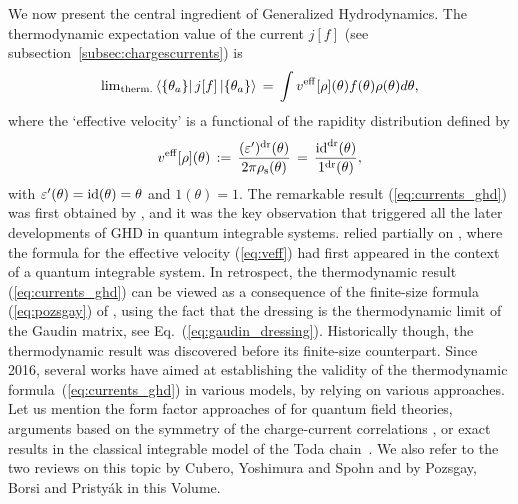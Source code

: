 \documentclass[onecolumn,amsfonts,showpacs,superscriptaddress]{revtex4-1}
\begin{document}
We now present the central ingredient of Generalized Hydrodynamics. The thermodynamic expectation value of the current $j[f]$ (see subsection~\ref{subsec:chargescurrents}) is
\begin{equation}
    \label{eq:currents_ghd}
	{\rm lim}_{\rm therm.}  \left< \{\theta_a \} \right|  j [f]  \left| \{ \theta_a \} \right>  \, = \, \int  v^{\rm eff}[\rho] (\theta) f(\theta) \rho(\theta) d \theta,
\end{equation}
where the `effective velocity' is a functional of the rapidity distribution defined by
\begin{equation}
    \label{eq:veff}
	v^{\rm eff}[\rho] (\theta) \, := \, \frac{ (\varepsilon')^{\rm dr} (\theta) }{2 \pi \rho_{\rm s}(\theta)} \, = \, \frac{ {\rm id}^{\rm dr} (\theta) }{1^{\rm dr}(\theta)}  ,
\end{equation}
with $\varepsilon'(\theta) = {\rm id}(\theta) = \theta$ and $1(\theta) = 1$. The remarkable result (\ref{eq:currents_ghd}) was first obtained by \citep{castro2016emergent,bertini2016transport}, and it was the key observation that triggered all the later developments of GHD in quantum integrable systems. \cite{bertini2016transport} relied partially on \citep{bonnes2014light}, where the formula for the effective velocity (\ref{eq:veff}) had first appeared in the context of a quantum integrable system. In retrospect, the thermodynamic result (\ref{eq:currents_ghd}) can be viewed as a consequence of the finite-size formula (\ref{eq:pozsgay}) of \citep{borsi2020current,pozsgay2020algebraic,pozsgay2020current}, using the fact that the dressing is the thermodynamic limit of the Gaudin matrix, see Eq.~(\ref{eq:gaudin_dressing}). Historically though, the thermodynamic result was discovered before its finite-size counterpart. Since 2016, several works have aimed at  establishing the validity of the thermodynamic formula~(\ref{eq:currents_ghd}) in various models, by relying on various approaches. Let us mention the form factor approaches of \citep{vu2019equations,cubero2019generalized,cubero2020generalized} for quantum field theories, arguments based on the symmetry of the charge-current correlations \citep{yoshimura2020collision}, or exact results in the classical integrable model of the Toda chain~\citep{bulchandani2019kinetic,cao2019gge,doyon2019generalized,spohn2020collision}. We also refer to the two reviews on this topic by Cubero, Yoshimura and Spohn and by Pozsgay, Borsi and Pristy\'ak in this Volume.
\end{document}
